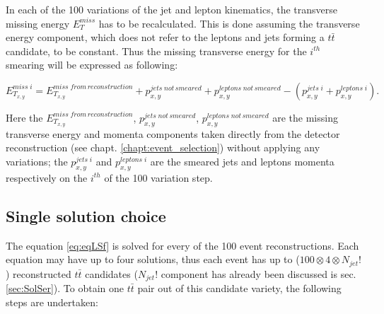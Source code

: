 In each of the 100 variations of the jet and lepton kinematics, the transverse missing energy $E_{T}^{miss}$ has to be recalculated. This is done
assuming the transverse energy component, which does not refer to the leptons and jets forming a $t\bar{t}$ candidate, to be constant. Thus the
missing transverse energy for the $i^{th}$ smearing will be expressed as following:

\begin{equation}
 E^{miss\;i}_{T_{x,y}} = E^{miss \; from \, reconstruction}_{T_{x,y}} + p^{jets \; not\,smeared}_{x,y} + p^{leptons\;not\,smeared}_{x,y} - (p^{jets\;i}_{x,y} + p^{leptons\;i}_{x,y}).
\end{equation}

Here the $E^{miss \; from \, reconstruction}_{T_{x,y}}$, $p^{jets \; not\,smeared}_{x,y}$, $p^{leptons\;not\,smeared}_{x,y}$ are the missing transverse energy and momenta
components taken directly from the detector reconstruction (see chapt. \ref{chapt:event_selection}) without applying any variations; the $p^{jets\;i}_{x,y}$ and $p^{leptons\;i}_{x,y}$
are the smeared jets and leptons momenta respectively on the $i^{th}$ of the 100 variation step.

\subsection{Single solution choice}

The equation \ref{eq:eqLSf} is solved for every of the 100 event reconstructions. Each equation may have up to four solutions, thus each event
has up to ($100 \otimes 4 \otimes N_{jet}!$) reconstructed $t\bar{t}$ candidates ($N_{jet}!$ component has already been discussed is sec. \ref{sec:SolSer}). 
To obtain one $t\bar{t}$ pair out of this candidate variety, the following steps are undertaken:


